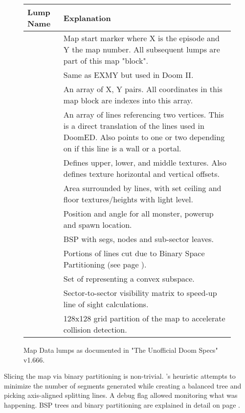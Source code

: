 \par
 \begin{figure}[H]
 \setlength{\belowcaptionskip}{-10pt}
\centering  
\begin{tabularx}{\textwidth}{ L{0.15} L{0.75} }
  \toprule
  \textbf{Lump Name} &  \textbf{Explanation} \\
  \toprule 
   
    & Map start marker where X is the episode and Y the map number. All subsequent lumps are part of this map "block".\\
    & Same as EXMY but used in Doom II.\\
    & An array of  X, Y pairs. All coordinates in this map block are indexes into this array.\\
    & An array of lines referencing two vertices. This is a direct translation of the lines used in DoomED. Also points to one or two  depending on if this line is a wall or a portal. \\
    & Defines upper, lower, and middle textures. Also defines texture horizontal and vertical offsets.\\
    & Area surrounded by lines, with set ceiling and floor textures/heights with light level.\\
    & Position and angle for all monster, powerup and spawn location.\\
   \toprule
    & BSP with segs, nodes and sub-sector leaves.\\
    & Portions of lines cut due to Binary Space Partitioning (see page \pageref{Binary Space Partitioning: Theory}).\\
    & Set of  representing a convex subspace.\\
   \toprule
    & Sector-to-sector visibility matrix to speed-up line of sight calculations.\\
   \toprule
    & 128x128 grid partition of the map  to accelerate collision detection.\\
   \toprule
\end{tabularx}
\caption{Map Data lumps as documented in "The Unofficial Doom Specs" v1.666.}
\end{figure}
\pagebreak

Slicing the map via binary partitioning is non-trivial. 's heuristic attempts to minimize the number of segments generated while creating a balanced tree and picking axis-aligned splitting lines. A debug flag  allowed monitoring what was happening. BSP trees and binary partitioning are explained in detail on page \pageref{Binary Space Partitioning: Theory}. \\
\par
{}
\par
